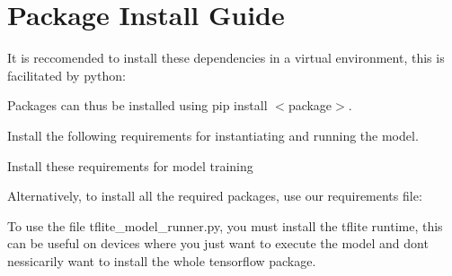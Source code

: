 \chapter{Package Install Guide}
\hypertarget{md_guides_2packages}{}\label{md_guides_2packages}
\label{md_guides_2packages_autotoc_md16}%
%


It is reccomended to install these dependencies in a virtual environment, this is facilitated by {\ttfamily python}\+:


\begin{DoxyCode}{0}

\end{DoxyCode}


Packages can thus be installed using {\ttfamily pip install \texorpdfstring{$<$}{<}package\texorpdfstring{$>$}{>}}.

Install the following requirements for instantiating and running the model.


\begin{DoxyCode}{0}

\end{DoxyCode}


Install these requirements for model training


\begin{DoxyCode}{0}

\end{DoxyCode}


Alternatively, to install all the required packages, use our requirements file\+:


\begin{DoxyCode}{0}

\end{DoxyCode}


To use the file {\ttfamily tflite\+\_\+model\+\_\+runner.\+py}, you must install the tflite runtime, this can be useful on devices where you just want to execute the model and don\textquotesingle{}t nessicarily want to install the whole tensorflow package.


\begin{DoxyCode}{0}

\end{DoxyCode}
 